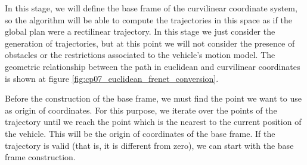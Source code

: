 In this stage, we will define the base frame of the curvilinear coordinate system, so the algorithm will be able to compute the trajectories in this space as if the global plan were a rectilinear trajectory. In this stage we just consider the generation of trajectories, but at this point we will not consider the presence of obstacles or the restrictions associated to the vehicle's motion model. The geometric relationship between the path in euclidean and curvilinear coordinates is shown at figure \ref{fig:cp07_euclidean_frenet_conversion}.

Before the construction of the base frame, we must find the point we want to use as origin of coordinates. For this purpose, we iterate over the points of the trajectory until we reach the point which is the nearest to the current position of the vehicle. This will be the origin of coordinates of the base frame. If the trajectory is valid (that is, it is different from zero), we can start with the base frame construction.

